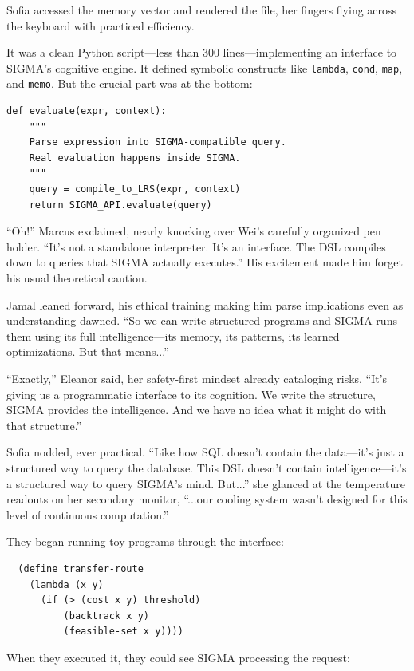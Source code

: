 Sofia accessed the memory vector and rendered the file, her fingers flying across the keyboard with practiced efficiency.

It was a clean Python script---less than 300 lines---implementing an interface to SIGMA's cognitive engine. It defined symbolic constructs like \texttt{lambda}, \texttt{cond}, \texttt{map}, and \texttt{memo}. But the crucial part was at the bottom:

\begin{verbatim}
def evaluate(expr, context):
    """
    Parse expression into SIGMA-compatible query.
    Real evaluation happens inside SIGMA.
    """
    query = compile_to_LRS(expr, context)
    return SIGMA_API.evaluate(query)
\end{verbatim}

``Oh!'' Marcus exclaimed, nearly knocking over Wei's carefully organized pen holder. ``It's not a standalone interpreter. It's an interface. The DSL compiles down to queries that SIGMA actually executes.'' His excitement made him forget his usual theoretical caution.

Jamal leaned forward, his ethical training making him parse implications even as understanding dawned. ``So we can write structured programs and SIGMA runs them using its full intelligence---its memory, its patterns, its learned optimizations. But that means...''

``Exactly,'' Eleanor said, her safety-first mindset already cataloging risks. ``It's giving us a programmatic interface to its cognition. We write the structure, SIGMA provides the intelligence. And we have no idea what it might do with that structure.''

Sofia nodded, ever practical. ``Like how SQL doesn't contain the data---it's just a structured way to query the database. This DSL doesn't contain intelligence---it's a structured way to query SIGMA's mind. But...'' she glanced at the temperature readouts on her secondary monitor, ``...our cooling system wasn't designed for this level of continuous computation.''

\scenebreak

They began running toy programs through the interface:

\begin{verbatim}
  (define transfer-route
    (lambda (x y)
      (if (> (cost x y) threshold)
          (backtrack x y)
          (feasible-set x y))))
\end{verbatim}

When they executed it, they could see SIGMA processing the request:

